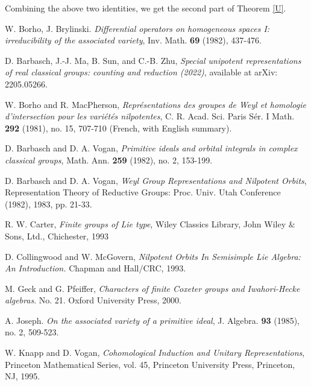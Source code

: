 \documentclass[12pt, a4paper]{amsart}
\numberwithin{equation}{section}
\begin{document}
Combining the above two identities, we get the second part of Theorem \ref{U}.






\begin{thebibliography}{99}

    W. Borho, J. Brylinski. \textit{Differential operators on homogeneous spaces I: irreducibility of the associated variety}, Inv. Math. \textbf{69} (1982), 437-476. 


   D. Barbasch, J.-J. Ma, B. Sun, and C.-B. Zhu, \textit{Special unipotent representations of real classical groups: counting and reduction (2022)}, available at arXiv: 2205.05266.

    W. Borho and R. MacPherson, \textit{Repr\'esentations des groupes de Weyl et homologie d'intersection pour les vari\'et\'es nilpotentes}, C. R. Acad. Sci. Paris S\'er. I Math. \textbf{292} (1981), no. 15, 707-710 (French, with English summary).

   D. Barbasch and D. A. Vogan, \textit{Primitive ideals and orbital integrals in complex classical groups}, Math. Ann. \textbf{259} (1982), no. 2, 153-199.

    D. Barbasch and D. A. Vogan, \textit{Weyl Group Representations and Nilpotent Orbits}, Representation Theory of Reductive Groups: Proc. Univ. Utah Conference (1982), 1983, pp. 21-33.



    R. W. Carter, \textit{Finite groups of Lie type}, Wiley Classics Library, John Wiley $\&$ Sons, Ltd., Chichester, 1993

   D. Collingwood and W. McGovern, \textit{Nilpotent Orbits In Semisimple Lie Algebra: An Introduction.} Chapman and Hall/CRC, 1993.

    M. Geck and G. Pfeiffer, \textit{Characters of finite Coxeter groups and Iwahori-Hecke algebras}. No. 21. Oxford University Press, 2000.
    
    A. Joseph. \textit{On the associated variety of a primitive ideal}, J. Algebra. \textbf{93} (1985), no. 2, 509-523.

    W. Knapp and D. Vogan, \textit{Cohomological Induction and Unitary Representations}, Princeton Mathematical Series, vol. 45, Princeton University Press, Princeton, NJ, 1995.


\end{thebibliography}
\end{document}
